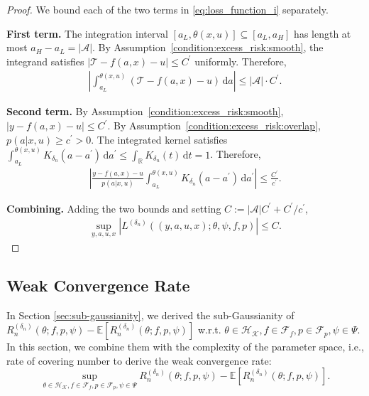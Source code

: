 \documentclass[12pt]{article}
\newcommand{\E}{\mathbb{E}}
\newcommand{\R}{\mathbb{R}}
\begin{document}
\begin{proof}
We bound each of the two terms in \eqref{eq:loss_function_i} separately.

\noindent\textbf{First term.}  The integration interval $[a_L,\theta(x,u)]\subseteq[a_L,a_H]$ has length at most $a_H-a_L=|\mathcal{A}|$.  By Assumption~\ref{condition:excess_risk:smooth}, the integrand satisfies $|\mathcal{T}-f(a,x)-u|\leq C^\prime$ uniformly.  Therefore,
\begin{align*}
\left|\int_{a_L}^{\theta(x,u)}(\mathcal{T}-f(a,x)-u)\,\mathrm{d}a\right|
\leq |\mathcal{A}|\cdot C^\prime.
\end{align*}

\noindent\textbf{Second term.}  By Assumption~\ref{condition:excess_risk:smooth}, $|y-f(a,x)-u|\leq C^\prime$.  By Assumption~\ref{condition:excess_risk:overlap}, $p(a|x,u)\geq c^\prime>0$.  The integrated kernel satisfies $\int_{a_L}^{\theta(x,u)}K_{\delta_n}(a-a^\prime)\,\mathrm{d}a^\prime\leq\int_\R K_{\delta_n}(t)\,\mathrm{d}t=1$.  Therefore,
\begin{align*}
\left|\frac{y-f(a,x)-u}{p(a|x,u)}\int_{a_L}^{\theta(x,u)}K_{\delta_n}(a-a^\prime)\,\mathrm{d}a^\prime\right|
\leq \frac{C^\prime}{c^\prime}.
\end{align*}

\noindent\textbf{Combining.}  Adding the two bounds and setting $C:=|\mathcal{A}|C^\prime+C^\prime/c^\prime$,
\begin{align*}
\sup_{y,a,u,x}\left|L^{(\delta_n)}((y,a,u,x);\theta,\psi,f,p)\right|\leq C.
\end{align*}
\end{proof}
\subsection{Weak Convergence Rate}
In Section \ref{sec:sub-gaussianity}, we derived the sub-Gaussianity of $R_n^{(\delta_n)}(\theta;f,p,\psi)-\E[R_n^{(\delta_n)}(\theta;f,p,\psi)]$ w.r.t. $\theta\in\mathcal{H}_\mathcal{K}, f\in\mathcal{F}_f, p\in\mathcal{F}_p, \psi\in\Psi$. In this section, we combine them with the complexity of the parameter space, i.e., rate of covering number to derive the weak convergence rate: 
$$\sup_{\theta\in\mathcal{H}_\mathcal{K}, f\in\mathcal{F}_f, p\in\mathcal{F}_p, \psi\in\Psi}R_n^{(\delta_n)}(\theta;f,p,\psi)-\E[R_n^{(\delta_n)}(\theta;f,p,\psi)].$$ 
\end{document}
